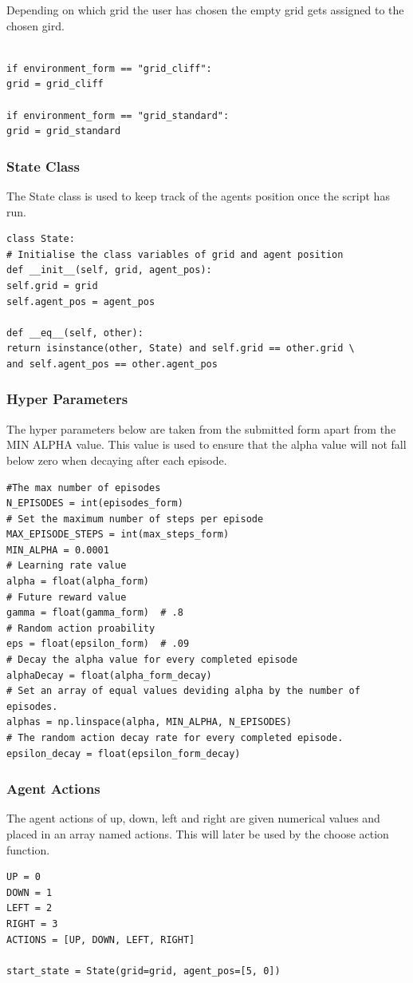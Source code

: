 Depending on which grid the user has chosen the empty grid gets assigned to the chosen gird.
\begin{verbatim}

if environment_form == "grid_cliff":
grid = grid_cliff

if environment_form == "grid_standard":
grid = grid_standard
\end{verbatim}
\subsubsection{State Class}
The State class is used to keep track of the agents position once the script has run.
\begin{verbatim}
class State:
# Initialise the class variables of grid and agent position
def __init__(self, grid, agent_pos):
self.grid = grid
self.agent_pos = agent_pos

def __eq__(self, other):
return isinstance(other, State) and self.grid == other.grid \
and self.agent_pos == other.agent_pos
\end{verbatim}
\subsubsection{Hyper Parameters}
The hyper parameters below are taken from the submitted form apart from the MIN ALPHA value. This value is used to ensure that the alpha value will not fall below zero when decaying after each episode.
\begin{verbatim}
#The max number of episodes
N_EPISODES = int(episodes_form)
# Set the maximum number of steps per episode
MAX_EPISODE_STEPS = int(max_steps_form)
MIN_ALPHA = 0.0001
# Learning rate value
alpha = float(alpha_form)
# Future reward value
gamma = float(gamma_form)  # .8
# Random action proability
eps = float(epsilon_form)  # .09
# Decay the alpha value for every completed episode
alphaDecay = float(alpha_form_decay)
# Set an array of equal values deviding alpha by the number of episodes.
alphas = np.linspace(alpha, MIN_ALPHA, N_EPISODES)
# The random action decay rate for every completed episode.
epsilon_decay = float(epsilon_form_decay)
\end{verbatim}
\subsubsection{Agent Actions}
The agent actions of up, down, left and right are given numerical values and placed in an array named actions. This will later be used by the choose action function.
\begin{verbatim}
UP = 0
DOWN = 1
LEFT = 2
RIGHT = 3
ACTIONS = [UP, DOWN, LEFT, RIGHT]

start_state = State(grid=grid, agent_pos=[5, 0])
\end{verbatim}
